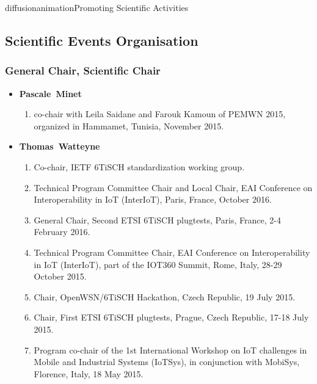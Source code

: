 \documentclass{ra2016}
\newcommand{\pascale} {\textbf{Pascale~Minet}}
\newcommand{\thomas}  {\textbf{Thomas~Watteyne}}
\begin{document}
\begin{module}{diffusion}{animation}{Promoting Scientific Activities}



\subsection{Scientific Events Organisation}
    \subsubsection{General Chair, Scientific Chair}
    \begin{itemize}
    \item \pascale
        \begin{enumerate}
            \item co-chair with Leila Saidane and Farouk Kamoun of PEMWN 2015, organized in Hammamet, Tunisia, November 2015.
        \end{enumerate}
    \item \thomas
        \begin{enumerate}
            \item Co-chair, IETF 6TiSCH standardization working group.
            \item Technical Program Committee Chair and Local Chair,  EAI Conference on Interoperability in IoT (InterIoT), Paris, France, October 2016.
            \item General Chair, Second ETSI 6TiSCH plugtests, Paris, France, 2-4 February 2016.
            \item Technical Program Committee Chair, EAI Conference on Interoperability in IoT (InterIoT), part of the IOT360 Summit, Rome, Italy, 28-29 October 2015.
            \item Chair, OpenWSN/6TiSCH Hackathon, Czech Republic, 19 July 2015.
            \item Chair, First ETSI 6TiSCH plugtests, Prague, Czech Republic, 17-18 July 2015.
            \item Program co-chair of the 1st International Workshop on IoT challenges in Mobile and Industrial Systems (IoT­Sys), in conjunction with MobiSys, Florence, Italy, 18 May 2015.

\end{enumerate}
\end{itemize}
\end{module}
\end{document}
